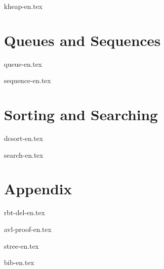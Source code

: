 \documentclass[b5paper,twoside]{book}
\begin{document}
{kheap-en.tex}


\part{Queues and Sequences}
{queue-en.tex}

{sequence-en.tex}

\part{Sorting and Searching}
{dcsort-en.tex}

{search-en.tex}

\part{Appendix}
\appendix
\noappendicestocpagenum
\addappheadtotoc

{rbt-del-en.tex}

{avl-proof-en.tex}

{stree-en.tex}

{bib-en.tex}



\printindex
\end{document}
